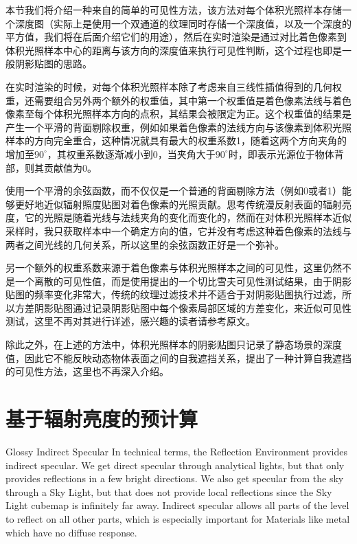 本节我们将介绍一种来自\cite{a:Lightprobeinterpolationusingtetrahedraltessellations}的简单的可见性方法，该方法对每个体积光照样本存储一个深度图（实际上是使用一个双通道的纹理同时存储一个深度值，以及一个深度的平方值，我们将在后面介绍它们的用途），然后在实时渲染是通过对比着色像素到体积光照样本中心的距离与该方向的深度值来执行可见性判断，这个过程也即是一般阴影贴图的思路。

在实时渲染的时候，对每个体积光照样本除了考虑来自三线性插值得到的几何权重，还需要组合另外两个额外的权重值，其中第一个权重值是着色像素法线与着色像素至每个体积光照样本方向的点积，其结果会被限定为正。这个权重值的结果是产生一个平滑的背面剔除权重，例如如果着色像素的法线方向与该像素到体积光照样本的方向完全重合，这种情况就具有最大的权重系数1，随着这两个方向夹角的增加至$90^{\circ}$，其权重系数逐渐减小到0，当夹角大于$90^{\circ}$时，即表示光源位于物体背部，则其贡献值为0。

\begin{myshaded}
	使用一个平滑的余弦函数，而不仅仅是一个普通的背面剔除方法（例如0或者1）能够更好地近似辐射照度贴图对着色像素的光照贡献。思考传统漫反射表面的辐射亮度，它的光照是随着光线与法线夹角的变化而变化的，然而在对体积光照样本近似采样时，我只获取样本中一个确定方向的值，它并没有考虑这种着色像素的法线与两者之间光线的几何关系，所以这里的余弦函数正好是一个弥补。
\end{myshaded}

另一个额外的权重系数来源于着色像素与体积光照样本之间的可见性，这里仍然不是一个离散的可见性值，而是使用\cite{a:VarianceShadowMaps}提出的一个切比雪夫可见性测试结果，由于阴影贴图的频率变化非常大，传统的纹理过滤技术并不适合于对阴影贴图执行过滤，所以方差阴影贴图通过记录阴影贴图中每个像素局部区域的方差变化，来近似可见性测试，这里不再对其进行详述，感兴趣的读者请参考原文。

除此之外，在上述的方法中，体积光照样本的阴影贴图只记录了静态场景的深度值，因此它不能反映动态物体表面之间的自我遮挡关系，\cite{a:PrecomputedLightinginCallofDuty}提出了一种计算自我遮挡的可见性方法，这里也不再深入介绍。




\section{基于辐射亮度的预计算}
Glossy Indirect Specular
In technical terms, the Reflection Environment provides indirect specular. We get direct specular through analytical lights, but that only provides reflections in a few bright directions. We also get specular from the sky through a Sky Light, but that does not provide local reflections since the Sky Light cubemap is infinitely far away. Indirect specular allows all parts of the level to reflect on all other parts, which is especially important for Materials like metal which have no diffuse response.



